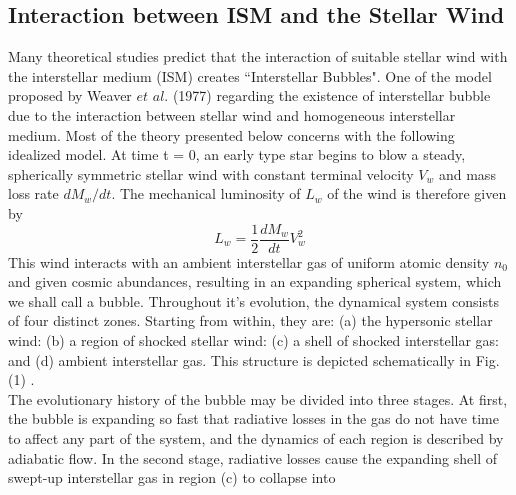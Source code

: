 \documentclass[fleqn,a4paper,12pt,oneside]{article}
\begin{document}
\subsection{Interaction between ISM and the Stellar Wind}Many theoretical studies predict that the interaction of suitable
stellar wind with the interstellar medium (ISM) creates
``Interstellar Bubbles". One of the model  proposed by Weaver $et$ $al$. (1977)
regarding the existence of interstellar bubble due to the
interaction between stellar wind and homogeneous interstellar
medium. Most of the theory presented below concerns with the
following idealized model. At time t = 0, an early type star
begins to blow a steady, spherically symmetric stellar wind with
constant terminal velocity $V_{w}$ and mass loss rate $dM_{w}/dt$.
The mechanical luminosity of $L_{w}$ of the wind is therefore
given by
\begin{equation}\label{1}
L_{w} ={\frac{1}{2}\frac{dM_w}{dt}V^{2}_{w}}
\end{equation}
This wind interacts with an ambient interstellar gas of uniform
atomic density $n_{0}$ and given cosmic abundances, resulting in
an expanding spherical system, which we shall call a bubble.
Throughout it's evolution, the dynamical system consists of four
distinct zones. Starting from within, they are: (a) the hypersonic
stellar wind: (b) a region of shocked stellar wind: (c) a shell of
shocked interstellar gas: and (d) ambient interstellar gas. This
structure is depicted schematically in Fig. (1) \cite{10}.
\\
The evolutionary history of the bubble may be divided into three
stages. At first, the bubble is expanding so fast that radiative
losses in the gas do not have time to affect any part of the
system, and the dynamics of each region is described by adiabatic
flow. In the second stage, radiative losses cause the expanding
shell of swept-up interstellar gas in region (c) to collapse into
\end{document}
